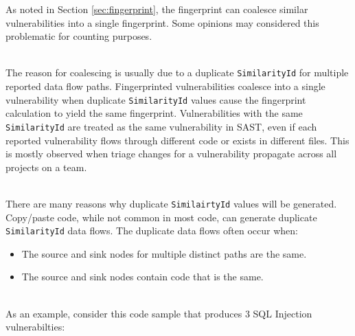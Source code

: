 As noted in Section \ref{sec:fingerprint}, the fingerprint can coalesce similar vulnerabilities into a single fingerprint.  Some opinions may considered this problematic for
counting purposes. 

\noindent\\The reason for coalescing is usually due to a duplicate \texttt{SimilarityId} for multiple reported data flow paths. Fingerprinted vulnerabilities coalesce into a 
single vulnerability when duplicate \texttt{SimilarityId} values cause the fingerprint calculation to yield the same fingerprint.  Vulnerabilities with the same 
\texttt{SimilarityId} are treated as the same vulnerability in SAST, even if each reported vulnerability flows through different code or exists in different files.  
This is mostly observed when triage changes for a vulnerability propagate across all projects on a team.

\noindent\\There are many reasons why duplicate \texttt{SimilairtyId} values will be generated. Copy/paste code, while not common in most code, can generate duplicate 
\texttt{SimilarityId} data flows.  The duplicate data flows often occur when:

\begin{itemize}
    \item The source and sink nodes for multiple distinct paths are the same.
    \item The source and sink nodes contain code that is the same.
\end{itemize}

\noindent\\As an example, consider this code sample that produces 3 SQL Injection vulnerabilties:

